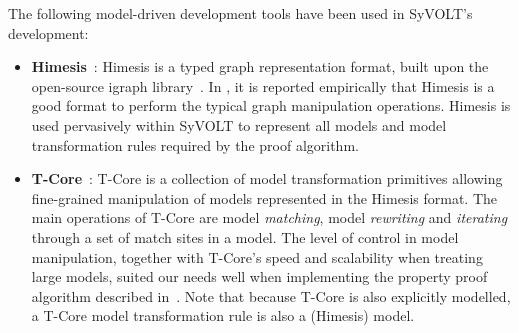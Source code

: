 The following model-driven development tools have been used in SyVOLT's
development:
\begin{itemize}


  \item \textbf{Himesis}~\cite{Provost2006}: Himesis is a typed graph representation
  format, built upon the open-source igraph library~\cite{igraphTool}. 
In \cite{Syriani2010b}, it is reported empirically that Himesis is a good format
to perform the typical graph manipulation operations.
  Himesis is used pervasively within SyVOLT to represent all models 
  and model transformation rules required by the proof algorithm.
  
  \item \textbf{T-Core}~\cite{Syriani2010a}: T-Core is a collection of model transformation
  primitives allowing fine-grained manipulation of models represented in the
  Himesis format.
  The main operations of T-Core are model \emph{matching},
  model \emph{rewriting} and \emph{iterating} through a set of match sites in a model.
  The level of control in model manipulation, together with T-Core's speed and
  scalability when treating large models, suited our needs well when
  implementing the property proof algorithm described in~\cite{Lucio2014}. Note that because
  T-Core is also explicitly modelled, a T-Core model transformation rule is also
  a (Himesis) model.


\end{itemize}
